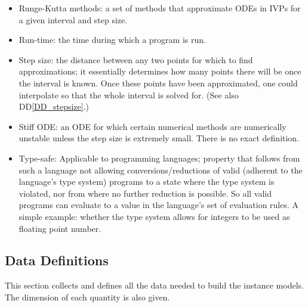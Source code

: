 \documentclass[12pt]{article}
\newcommand{\ddref}[1]{DD\ref{#1}}
\begin{document}
\begin{itemize}
\item Runge-Kutta methods: a set of methods that approximate ODEs in IVPs for a 
given interval and step size.

\item Run-time: the time during which a program is run.

\item Step size: the distance between any two points for which to find 
approximations; it essentially determines how many points there will be once 
the interval is known. Once these points have been approximated, one could 
interpolate so that the whole interval is solved for. (See also 
\ddref{DD_stepsize}.)

\item Stiff ODE: an ODE for which certain numerical methods are numerically 
unstable unless the step size is extremely small. There is no exact definition.

\item Type-safe: Applicable to programming languages; property that follows 
from such a language not allowing conversions/reductions of valid (adherent to 
the language's type system) programs to a state where the type system is 
violated, nor from where no further reduction is possible. So all valid 
programs can evaluate to a value in the language's set of evaluation rules. A 
simple example: whether the type system allows for integers to be used as 
floating point number.
\end{itemize}

\subsection{Data Definitions} \label{sec_datadef}

This section collects and defines all the data needed to build the instance
models. The dimension of each quantity is also given.
~\newline
\end{document}
